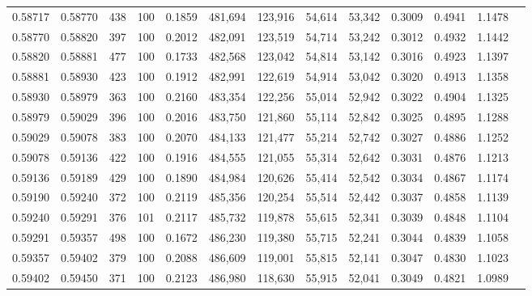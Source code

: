 \begin{tabular}{rrrrrrrrrrrrr}
0.58717 & 0.58770 &   438 & 100 &                                     0.1859 & 481,694 & 123,916 &  54,614 &  53,342 & 0.3009 & 0.4941 & 1.1478 \\
0.58770 & 0.58820 &   397 & 100 &                                     0.2012 & 482,091 & 123,519 &  54,714 &  53,242 & 0.3012 & 0.4932 & 1.1442 \\
0.58820 & 0.58881 &   477 & 100 &                                     0.1733 & 482,568 & 123,042 &  54,814 &  53,142 & 0.3016 & 0.4923 & 1.1397 \\
0.58881 & 0.58930 &   423 & 100 &                                     0.1912 & 482,991 & 122,619 &  54,914 &  53,042 & 0.3020 & 0.4913 & 1.1358 \\
0.58930 & 0.58979 &   363 & 100 &                                     0.2160 & 483,354 & 122,256 &  55,014 &  52,942 & 0.3022 & 0.4904 & 1.1325 \\
0.58979 & 0.59029 &   396 & 100 &                                     0.2016 & 483,750 & 121,860 &  55,114 &  52,842 & 0.3025 & 0.4895 & 1.1288 \\
0.59029 & 0.59078 &   383 & 100 &                                     0.2070 & 484,133 & 121,477 &  55,214 &  52,742 & 0.3027 & 0.4886 & 1.1252 \\
0.59078 & 0.59136 &   422 & 100 &                                     0.1916 & 484,555 & 121,055 &  55,314 &  52,642 & 0.3031 & 0.4876 & 1.1213 \\
0.59136 & 0.59189 &   429 & 100 &                                     0.1890 & 484,984 & 120,626 &  55,414 &  52,542 & 0.3034 & 0.4867 & 1.1174 \\
0.59190 & 0.59240 &   372 & 100 &                                     0.2119 & 485,356 & 120,254 &  55,514 &  52,442 & 0.3037 & 0.4858 & 1.1139 \\
0.59240 & 0.59291 &   376 & 101 &                                     0.2117 & 485,732 & 119,878 &  55,615 &  52,341 & 0.3039 & 0.4848 & 1.1104 \\
0.59291 & 0.59357 &   498 & 100 &                                     0.1672 & 486,230 & 119,380 &  55,715 &  52,241 & 0.3044 & 0.4839 & 1.1058 \\
0.59357 & 0.59402 &   379 & 100 &                                     0.2088 & 486,609 & 119,001 &  55,815 &  52,141 & 0.3047 & 0.4830 & 1.1023 \\
0.59402 & 0.59450 &   371 & 100 &                                     0.2123 & 486,980 & 118,630 &  55,915 &  52,041 & 0.3049 & 0.4821 & 1.0989 \\

\end{tabular}
